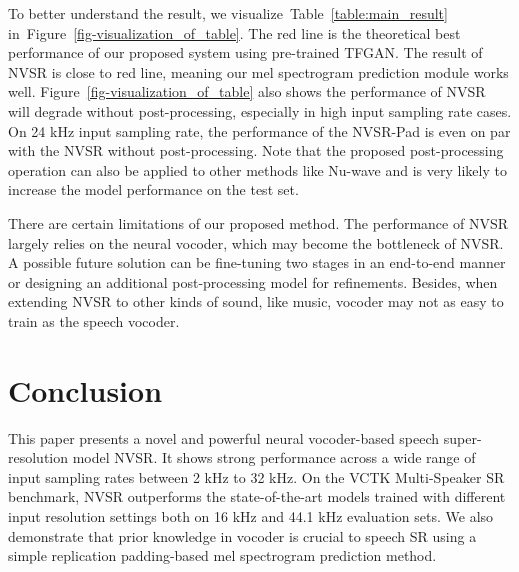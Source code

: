 \documentclass[a4paper]{article}
\def\Figref#1{Figure~\ref{#1}}
\def\Tabref#1{Table~\ref{#1}}
\begin{document}
To better understand the result, we visualize~\Tabref{table:main_result} in~\Figref{fig-visualization_of_table}. The red line is the theoretical best performance of our proposed system using pre-trained TFGAN. The result of NVSR is close to red line, meaning our mel spectrogram prediction module works well. \Figref{fig-visualization_of_table} also shows the performance of NVSR will degrade without post-processing, especially in high input sampling rate cases. On \num{24} kHz input sampling rate, the performance of the NVSR-Pad is even on par with the NVSR without post-processing. Note that the proposed post-processing operation can also be applied to other methods like Nu-wave and is very likely to increase the model performance on the test set. 

There are certain limitations of our proposed method. The performance of NVSR largely relies on the neural vocoder, which may become the bottleneck of NVSR. 
A possible future solution can be fine-tuning two stages in an end-to-end manner or designing an additional post-processing model for refinements. Besides, when extending NVSR to other kinds of sound, like music, vocoder may not as easy to train as the speech vocoder. 


\section{Conclusion}
\label{sec:conclusion}
This paper presents a novel and powerful neural vocoder-based speech super-resolution model NVSR. It shows strong performance across a wide range of input sampling rates between \num{2} kHz to \num{32} kHz. On the VCTK Multi-Speaker SR benchmark, NVSR outperforms the state-of-the-art models trained with different input resolution settings both on \num{16} kHz and \num{44.1} kHz evaluation sets. We also demonstrate that prior knowledge in vocoder is crucial to speech SR using a simple replication padding-based mel spectrogram prediction method. 




\end{document}
